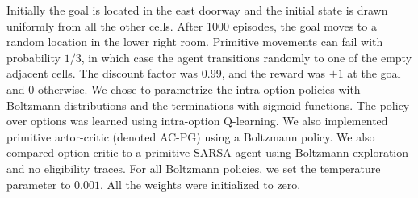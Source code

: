 \documentclass[letterpaper]{article}
\begin{document}
Initially the goal is located in the east doorway and the initial state
is drawn uniformly from all the other cells. After 1000 episodes,
the goal   moves to a random location in the lower right room. Primitive movements can fail with
probability $1/3$, in which case the agent transitions randomly to one of the
 empty adjacent cells. The discount factor was  $0.99$, and the reward was
$+1$  at the goal  and $0$ otherwise.
We chose to parametrize the intra-option policies with Boltzmann distributions
and the terminations with sigmoid functions. The policy
over options was learned using intra-option Q-learning.
We also implemented
primitive actor-critic  (denoted \textsc{AC-PG}) using a Boltzmann policy.
We also compared option-critic to a
primitive SARSA agent using Boltzmann exploration
and no eligibility traces.
For all Boltzmann policies, we set the temperature parameter to $0.001$.
All the weights were initialized to zero.
\end{document}
